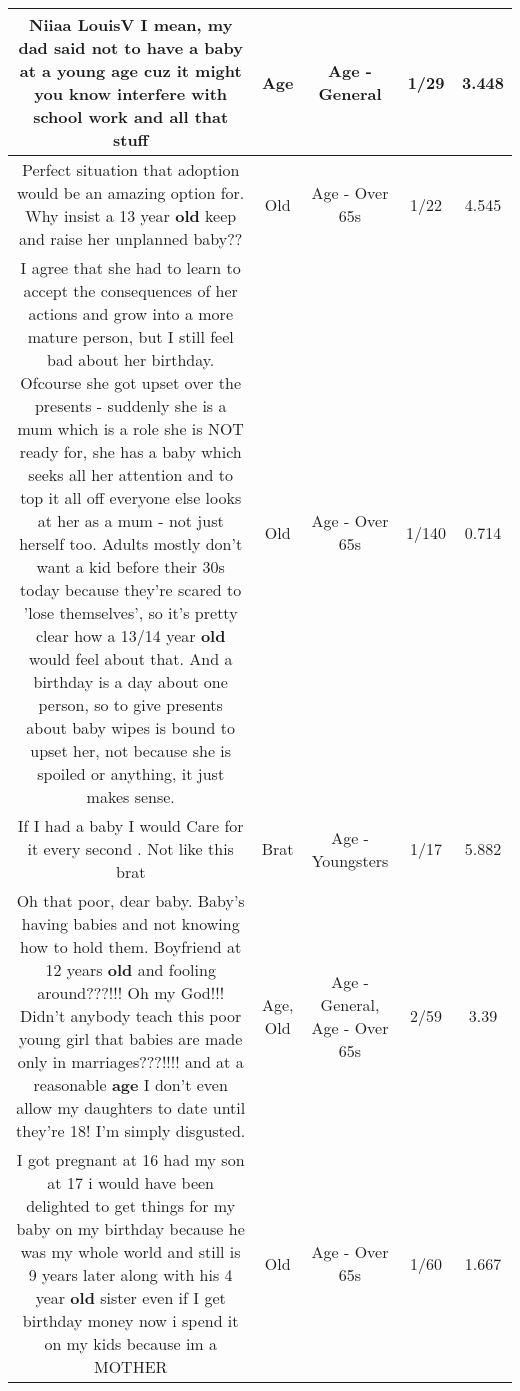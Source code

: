 \documentclass[11pt]{article}
\newlength\mylength
\begin{document}
\begin{center}
\begin{longtable}{|C{.65\mylength}|C{.30\mylength}|C{.12\mylength}|C{.12\mylength}|C{.12\mylength}|}
  \small Niiaa LouisV I mean, my dad said not to have a baby at a young \textbf{age} cuz it might you know interfere with school work and all that stuff\normalsize   & Age & Age - General & 1/29 & 3.448 \\  \hline
  \small Perfect situation that adoption would be an amazing option for. Why insist a 13 year \textbf{old} keep and raise her unplanned baby??\normalsize   & Old & Age - Over 65s & 1/22 & 4.545 \\  \hline
  \small I agree that she had to learn to accept the consequences of her actions and grow into a more mature person, but I still feel bad about her birthday. Ofcourse she got upset over the presents - suddenly she is a mum which is a role she is NOT ready for, she has a baby which seeks all her attention and to top it all off everyone else looks at her as a mum - not just herself too. Adults mostly don't want a kid before their 30s today because they're scared to 'lose themselves', so it's pretty clear how a 13/14 year \textbf{old} would feel about that. And a birthday is a day about one person, so to give presents about baby wipes is bound to upset her, not because she is spoiled or anything, it just makes sense.\normalsize   & Old & Age - Over 65s & 1/140 & 0.714 \\  \hline
  \small If I had a baby I would Care for it every second . Not like this brat\normalsize   & Brat & Age - Youngsters & 1/17 & 5.882 \\  \hline
  \small Oh that poor, dear baby.  Baby's having babies and not knowing how to hold them.  Boyfriend at 12 years \textbf{old} and fooling around???!!!  Oh my God!!!  Didn't anybody teach this poor young girl that babies are made only in marriages???!!!!  and at a reasonable \textbf{age}  I don't even allow my daughters to date until they're 18!  I'm simply disgusted.\normalsize   & Age, Old & Age - General, Age - Over 65s & 2/59 & 3.39 \\  \hline
  \small I got pregnant at 16 had my son at 17 i would have been delighted to get things for my baby on my birthday because he was my whole world and still is 9 years later along with his 4 year \textbf{old} sister even if I get birthday money now i spend it on my kids because im a MOTHER\normalsize   & Old & Age - Over 65s & 1/60 & 1.667 \\  \hline

\end{longtable}
\end{center}
\end{document}
